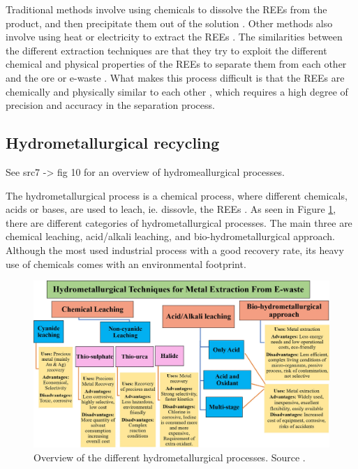 Traditional methods involve using chemicals to dissolve the REEs from the product, and then precipitate them out of the solution \cite{sanchez2024}. Other methods also involve using heat or electricity to extract the REEs \cite{sanchez2024}. The similarities between the different extraction techniques are that they try to exploit the different chemical and physical properties of the REEs to separate them from each other and the ore or e-waste \cite{sanchez2024}. What makes this process difficult is that the REEs are chemically and physically similar to each other \cite{britannica2024}, which requires a high degree of precision and accuracy in the separation process.


\subsection{Hydrometallurgical recycling}

See src7 -> fig 10 for an overview of hydromeallurgical processes.

The hydrometallurgical process is a chemical process, where different chemicals, acids or bases, are used to leach, ie. dissovle, the REEs \cite{javed2024}. As seen in Figure \ref{fig:hydroprocess}, there are different categories of hydrometallurgical processes. The main three are chemical leaching, acid/alkali leaching, and bio-hydrometallurgical approach. Although the most used industrial process with a good recovery rate, its heavy use of chemicals comes with an environmental footprint.

\begin{figure}
    \centering
    \includegraphics[width=1\linewidth]{figures/javier_processoverview.png}
    \caption{Overview of the different hydrometallurgical processes. Source \cite{javed2024}.}
    \label{fig:hydroprocess}
\end{figure}


